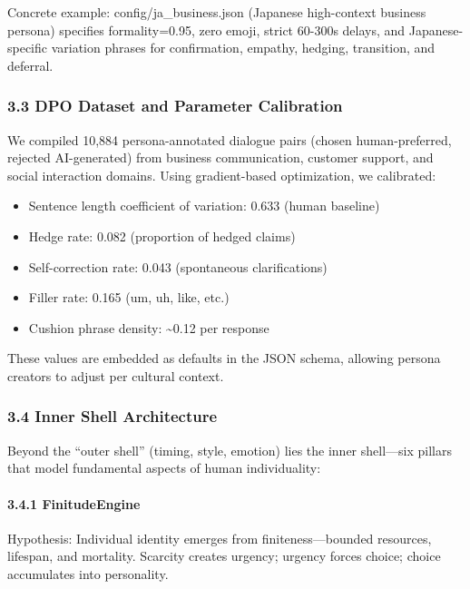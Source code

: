 \documentclass[
]{article}
\providecommand{\tightlist}{%
  \setlength{\itemsep}{0pt}\setlength{\parskip}{0pt}}
\begin{document}
Concrete example: config/ja\_business.json (Japanese high-context
business persona) specifies formality=0.95, zero emoji, strict 60-300s
delays, and Japanese-specific variation phrases for confirmation,
empathy, hedging, transition, and deferral.

\hypertarget{dpo-dataset-and-parameter-calibration}{%
\subsubsection{3.3 DPO Dataset and Parameter
Calibration}\label{dpo-dataset-and-parameter-calibration}}

We compiled 10,884 persona-annotated dialogue pairs (chosen
human-preferred, rejected AI-generated) from business communication,
customer support, and social interaction domains. Using gradient-based
optimization, we calibrated:

\begin{itemize}
\tightlist
\item
  Sentence length coefficient of variation: 0.633 (human baseline)
\item
  Hedge rate: 0.082 (proportion of hedged claims)
\item
  Self-correction rate: 0.043 (spontaneous clarifications)
\item
  Filler rate: 0.165 (um, uh, like, etc.)
\item
  Cushion phrase density: \textasciitilde0.12 per response
\end{itemize}

These values are embedded as defaults in the JSON schema, allowing
persona creators to adjust per cultural context.

\hypertarget{inner-shell-architecture}{%
\subsubsection{3.4 Inner Shell
Architecture}\label{inner-shell-architecture}}

Beyond the ``outer shell'' (timing, style, emotion) lies the inner
shell---six pillars that model fundamental aspects of human
individuality:

\hypertarget{finitudeengine}{%
\paragraph{3.4.1 FinitudeEngine}\label{finitudeengine}}

Hypothesis: Individual identity emerges from finiteness---bounded
resources, lifespan, and mortality. Scarcity creates urgency; urgency
forces choice; choice accumulates into personality.
\end{document}
